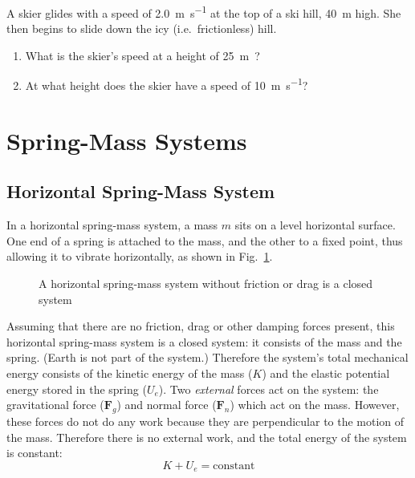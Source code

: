 \begin{example}
  A skier glides with a speed of \SI{2.0}{\metre\per\second} at the top of a
  ski hill, \SI{40}{\metre} high. She then begins to slide down
  the icy (i.e.\ frictionless) hill.
  \begin{enumerate}[leftmargin=12pt]
  \item What is the skier's speed at a height of \SI{25}\metre?
  \item At what height does the skier have a speed of
    \SI{10}{\metre\per\second}?
  \end{enumerate}
\end{example}



\section{Spring-Mass Systems}

\subsection{Horizontal Spring-Mass System}
In a horizontal spring-mass system, a mass $m$ sits on a level horizontal
surface. One end of a spring is attached to the mass, and the other to a fixed
point, thus allowing it to vibrate horizontally, as shown in
Fig.~\ref{fig:hspring-mass}.
\begin{figure}[ht]
  \centering
  \caption{A horizontal spring-mass system without friction or drag is a
  closed system}
  \label{fig:hspring-mass}
\end{figure}
Assuming that there are no friction, drag or other damping forces present, this
horizontal spring-mass system is a closed system: it consists of the mass and
the spring. (Earth is not part of the system.) Therefore the system's total
mechanical energy consists of the kinetic energy of the mass ($K$) and the
elastic potential energy stored in the spring ($U_e$). Two \emph{external}
forces act on the system: the gravitational force ($\bm F_g$) and normal
force ($\bm F_n$) which act on the mass. However, these forces do not do
any work because they are perpendicular to the motion of the mass. Therefore
there is no external work, and the total energy of the system is constant:
\begin{equation}
  K+U_e=\text{constant}
\end{equation}


